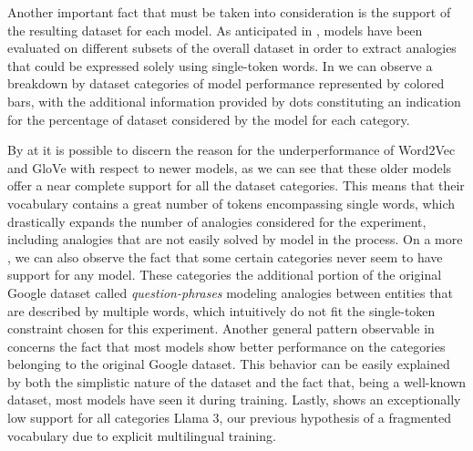 Another important fact that must be taken into consideration is the support of the resulting dataset for each model.
As anticipated in , models have been evaluated on different subsets of the overall dataset in order to extract analogies that could be expressed solely using single-token words.
In  we can observe a breakdown by dataset categories of model performance represented by colored bars, with the additional information provided by dots constituting an indication for the percentage of dataset considered by the model for each category.

By  at  it is possible to discern the reason for the underperformance of Word2Vec and GloVe with respect to newer models, as we can see that these older models offer a near complete support for all the dataset categories.
This means that their vocabulary contains a great number of tokens encompassing single words, which drastically expands the number of analogies considered for the experiment, including analogies that are not easily solved by model in the process.
On a more , we can also observe the fact that some certain categories never seem to have support for any model.
These categories  the additional portion of the original Google dataset called \emph{question-phrases} modeling analogies between entities that are described by multiple words, which intuitively do not fit the single-token constraint chosen for this experiment.
Another general pattern observable in  concerns the fact that most models show better performance on the categories belonging to the original Google dataset.
This behavior can be easily explained by both the simplistic nature of the dataset and the fact that, being a well-known dataset, most models have seen it during training.
Lastly,  shows an exceptionally low support for all categories  Llama 3,  our previous hypothesis of a fragmented vocabulary due to explicit multilingual training.

\begin{figure}[t!]
    \centering
    \quad
    \caption{}
    \label{fig:exp_emb_1_D}
\end{figure}

